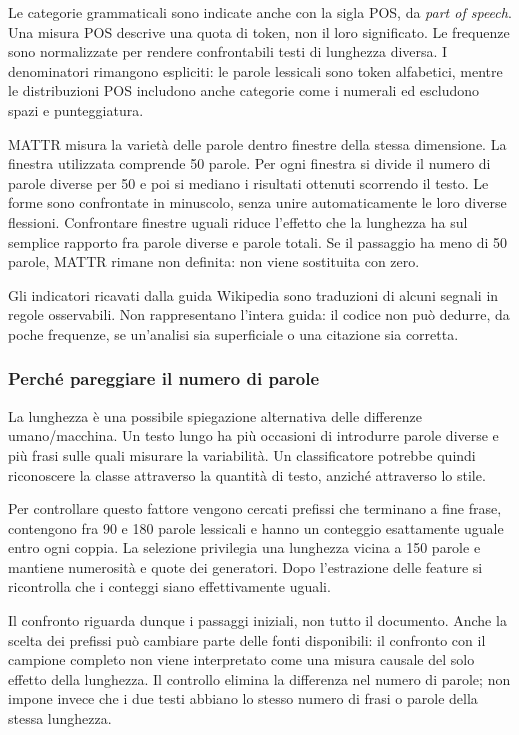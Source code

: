\documentclass[11pt,a4paper]{article}
\begin{document}
Le categorie grammaticali sono indicate anche con la sigla POS, da \emph{part of speech}. Una misura POS descrive una quota di token, non il loro significato. Le frequenze sono normalizzate per rendere confrontabili testi di lunghezza diversa. I denominatori rimangono espliciti: le parole lessicali sono token alfabetici, mentre le distribuzioni POS includono anche categorie come i numerali ed escludono spazi e punteggiatura.

MATTR misura la varietà delle parole dentro finestre della stessa dimensione. La finestra utilizzata comprende 50 parole. Per ogni finestra si divide il numero di parole diverse per 50 e poi si mediano i risultati ottenuti scorrendo il testo. Le forme sono confrontate in minuscolo, senza unire automaticamente le loro diverse flessioni. Confrontare finestre uguali riduce l'effetto che la lunghezza ha sul semplice rapporto fra parole diverse e parole totali. Se il passaggio ha meno di 50 parole, MATTR rimane non definita: non viene sostituita con zero.

Gli indicatori ricavati dalla guida Wikipedia sono traduzioni di alcuni segnali in regole osservabili. Non rappresentano l'intera guida: il codice non può dedurre, da poche frequenze, se un'analisi sia superficiale o una citazione sia corretta.

\subsubsection{Perché pareggiare il numero di parole}\label{perchuxe9-pareggiare-il-numero-di-parole}

La lunghezza è una possibile spiegazione alternativa delle differenze umano/macchina. Un testo lungo ha più occasioni di introdurre parole diverse e più frasi sulle quali misurare la variabilità. Un classificatore potrebbe quindi riconoscere la classe attraverso la quantità di testo, anziché attraverso lo stile.

Per controllare questo fattore vengono cercati prefissi che terminano a fine frase, contengono fra 90 e 180 parole lessicali e hanno un conteggio esattamente uguale entro ogni coppia. La selezione privilegia una lunghezza vicina a 150 parole e mantiene numerosità e quote dei generatori. Dopo l'estrazione delle feature si ricontrolla che i conteggi siano effettivamente uguali.

Il confronto riguarda dunque i passaggi iniziali, non tutto il documento. Anche la scelta dei prefissi può cambiare parte delle fonti disponibili: il confronto con il campione completo non viene interpretato come una misura causale del solo effetto della lunghezza. Il controllo elimina la differenza nel numero di parole; non impone invece che i due testi abbiano lo stesso numero di frasi o parole della stessa lunghezza.
\end{document}

